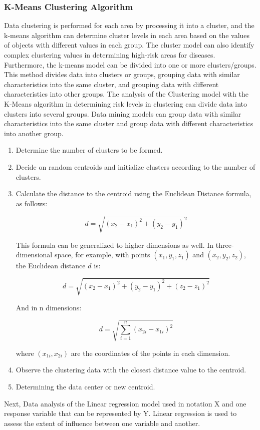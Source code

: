 \documentclass[conference]{IEEEtran}
\begin{document}
\subsubsection{K-Means Clustering Algorithm}
Data clustering is performed for each area by processing it into a cluster, and the k-means algorithm can determine cluster levels in each area based on the values of objects with different values in each group. The cluster model can also identify complex clustering values in determining high-risk areas for diseases. Furthermore, the k-means model can be divided into one or more clusters/groups. This method divides data into clusters or groups, grouping data with similar characteristics into the same cluster, and grouping data with different characteristics into other groups.
The analysis of the Clustering model with the K-Means algorithm in determining risk levels in clustering can divide data into clusters into several groups. Data mining models can group data with similar characteristics into the same cluster and group data with different characteristics into another group.

\begin{enumerate}
\item Determine the number of clusters to be formed.
\item Decide on random centroids and initialize clusters according to the number of clusters.
\item Calculate the distance to the centroid using the Euclidean Distance formula, as follows:

\[d = \sqrt{(x_2 - x_1)^2 + (y_2 - y_1)^2}
\]

This formula can be generalized to higher dimensions as well. In three-dimensional space, for example, with points \((x_1, y_1, z_1)\) and \((x_2, y_2, z_2)\), the Euclidean distance \(d\) is:


\[
    d = \sqrt{(x_2 - x_1)^2 + (y_2 - y_1)^2 + (z_2 - z_1)^2}
\]

And in n dimensions:

\[
    d = \sqrt{\sum_{i=1}^n (x_{2i} - x_{1i})^2}
\]

where \((x_{1i}, x_{2i})\) are the coordinates of the points in each dimension.
\item Observe the clustering data with the closest distance value to the centroid.
\item Determining the data center or new centroid.
\end{enumerate}

Next, Data analysis of the Linear regression model used in notation X and one response variable that can be represented by Y. Linear regression is used to assess the extent of influence between one variable and another.
\end{document}
